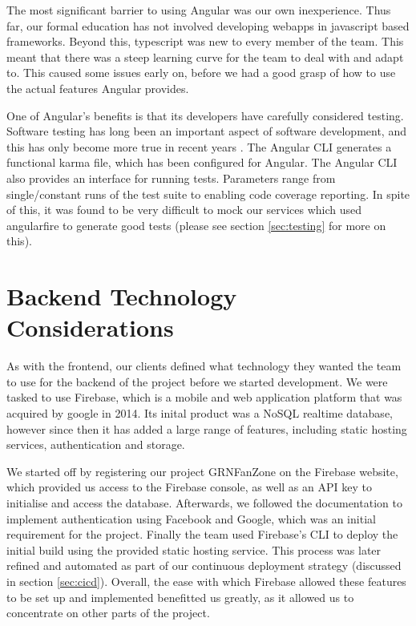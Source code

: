 \documentclass{l3proj}
\begin{document}
The most significant barrier to using Angular was our own inexperience.
 Thus far, our formal education has not involved developing webapps in
 javascript based frameworks. Beyond this, typescript was new to every
 member of the team. This meant that there was a steep learning curve for
 the team to deal with and adapt to. This caused some issues early on,
 before we had a good grasp of how to use the actual features Angular
 provides.

One of Angular's benefits is that its developers have carefully
 considered testing. Software testing has long been an important
 aspect of software development, and this has only become more true
 in recent years \cite{tuteja2012testing}. The Angular CLI generates
 a functional karma file, which has been configured for Angular. The
 Angular CLI also provides an interface for running tests. Parameters
 range from single/constant runs of the test suite to enabling code
 coverage reporting. In spite of this, it was found to be very
 difficult to mock our services which used angularfire to generate
 good tests (please see section \ref{sec:testing} for more on this).



\section{Backend Technology Considerations} %
\label{sec:backend}

As with the frontend, our clients defined what technology they wanted the team
 to use for the backend of the project before we started development. We were
 tasked to use Firebase, which is a mobile and web application platform that
 was acquired by google in 2014. Its inital product was a NoSQL realtime database,
 however since then it has added a large range of features, including static
 hosting services, authentication and storage.

We started off by registering our project GRNFanZone on the Firebase website,
 which provided us access to the Firebase console, as well as an API key to
 initialise and access the database. Afterwards, we followed the documentation
 to implement authentication using Facebook and Google, which was an initial
 requirement for the project. Finally the team used Firebase's CLI to deploy
 the initial build using the provided static hosting service. This process
 was later refined and automated as part of our continuous deployment strategy
 (discussed in section \ref{sec:cicd}). Overall, the ease with which Firebase 
 allowed these features to be set up and implemented benefitted us greatly, 
 as it allowed us to concentrate on other parts of the project.
\end{document}
